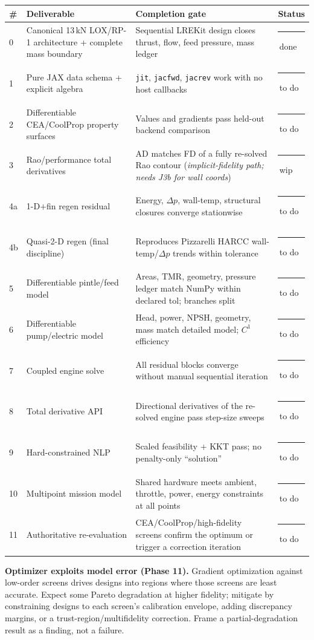 \documentclass[11pt]{article}
\newcommand{\cmd}[1]{\nolinkurl{#1}}
\newcommand{\badge}[2]{{\color{#1}\rule[-0.05ex]{1.0ex}{1.0ex}}\,\small #2}
\newcommand{\stDone}{\badge{okgreen}{done}}
\newcommand{\stWip}{\badge{wiporange}{wip}}
\newcommand{\stTodo}{\badge{rulegray}{to do}}
\begin{document}
{\small
\begin{longtable}{@{}p{0.5cm}p{5.4cm}p{5.4cm}p{1.4cm}@{}}
\toprule
\textbf{\#} & \textbf{Deliverable} & \textbf{Completion gate} & \textbf{Status} \\
\midrule
\endhead
0 & Canonical 13\,kN LOX/RP-1 architecture + complete mass boundary & Sequential LREKit design closes thrust, flow, feed pressure, mass ledger & \stDone \\
1 & Pure JAX data schema + explicit algebra & \cmd{jit}, \cmd{jacfwd}, \cmd{jacrev} work with no host callbacks & \stTodo \\
2 & Differentiable CEA/CoolProp property surfaces & Values and gradients pass held-out backend comparison & \stTodo \\
3 & Rao/performance total derivatives & AD matches FD of a fully re-solved Rao contour (\emph{implicit-fidelity path; needs J3b for wall coords}) & \stWip \\
4a & 1-D$+$fin regen residual & Energy, $\Delta p$, wall-temp, structural closures converge stationwise & \stTodo \\
4b & Quasi-2-D regen (final discipline) & Reproduces Pizzarelli HARCC wall-temp/$\Delta p$ trends within tolerance & \stTodo \\
5 & Differentiable pintle/feed model & Areas, TMR, geometry, pressure ledger match NumPy within declared tol; branches split & \stTodo \\
6 & Differentiable pump/electric model & Head, power, NPSH, geometry, mass match detailed model; $C^1$ efficiency & \stTodo \\
7 & Coupled engine solve & All residual blocks converge without manual sequential iteration & \stTodo \\
8 & Total derivative API & Directional derivatives of the re-solved engine pass step-size sweeps & \stTodo \\
9 & Hard-constrained NLP & Scaled feasibility + KKT pass; no penalty-only ``solution'' & \stTodo \\
10 & Multipoint mission model & Shared hardware meets ambient, throttle, power, energy constraints at all points & \stTodo \\
11 & Authoritative re-evaluation & CEA/CoolProp/high-fidelity screens confirm the optimum or trigger a correction iteration & \stTodo \\
\bottomrule
\end{longtable}}

\begin{warnbox}
\textbf{Optimizer exploits model error (Phase 11).} Gradient optimization against
low-order screens drives designs into regions where those screens are least
accurate. Expect some Pareto degradation at higher fidelity; mitigate by
constraining designs to each screen's calibration envelope, adding discrepancy
margins, or a trust-region/multifidelity correction. Frame a partial-degradation
result as a finding, not a failure.
\end{warnbox}
\end{document}
